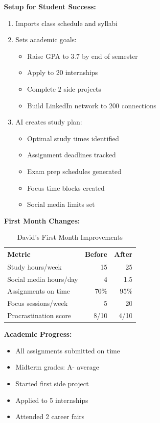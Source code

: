 \textbf{Setup for Student Success:}
\begin{enumerate}
    \item Imports class schedule and syllabi
    \item Sets academic goals:
    \begin{itemize}
        \item Raise GPA to 3.7 by end of semester
        \item Apply to 20 internships
        \item Complete 2 side projects
        \item Build LinkedIn network to 200 connections
    \end{itemize}
    
    \item AI creates study plan:
    \begin{itemize}
        \item Optimal study times identified
        \item Assignment deadlines tracked
        \item Exam prep schedules generated
        \item Focus time blocks created
        \item Social media limits set
    \end{itemize}
\end{enumerate}

\textbf{First Month Changes:}

\begin{table}[H]
\centering
\caption{David's First Month Improvements}
\begin{tabular}{|l|r|r|}
\hline
\rowcolor{lightgray}
\textbf{Metric} & \textbf{Before} & \textbf{After} \\
\hline
Study hours/week & 15 & 25 \\
\hline
Social media hours/day & 4 & 1.5 \\
\hline
Assignments on time & 70\% & 95\% \\
\hline
Focus sessions/week & 5 & 20 \\
\hline
Procrastination score & 8/10 & 4/10 \\
\hline
\end{tabular}
\end{table}

\textbf{Academic Progress:}
\begin{itemize}
    \item All assignments submitted on time
    \item Midterm grades: A- average
    \item Started first side project
    \item Applied to 5 internships
    \item Attended 2 career fairs
\end{itemize}

